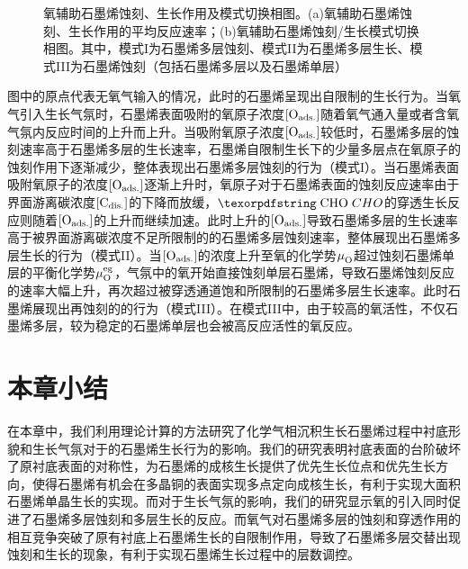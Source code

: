 \begin{figure}[htb]
    \caption{氧辅助石墨烯蚀刻、生长作用及模式切换相图。(a)氧辅助石墨烯蚀刻、生长作用的平均反应速率；(b)氧辅助石墨烯蚀刻/生长模式切换相图。其中，模式I为石墨烯多层蚀刻、模式II为石墨烯多层生长、模式III为石墨烯蚀刻（包括石墨烯多层以及石墨烯单层）}
    \label{fig:FLG_model}
\end{figure}

图中的原点代表无氧气输入的情况，此时的石墨烯呈现出自限制的生长行为。当氧气引入生长气氛时，石墨烯表面吸附的氧原子浓度$\rm{\left[O_{ads.}\right]} \it$随着氧气通入量或者含氧气氛内反应时间的上升而上升。当吸附氧原子浓度$\rm{\left[O_{ads.}\right]} \it$较低时，石墨烯多层的蚀刻速率高于石墨烯多层的生长速率，石墨烯自限制生长下的少量多层点在氧原子的蚀刻作用下逐渐减少，整体表现出石墨烯多层蚀刻的行为（模式I）。当石墨烯表面吸附氧原子的浓度$\rm{\left[O_{ads.}\right]} \it$逐渐上升时，氧原子对于石墨烯表面的蚀刻反应速率由于界面游离碳浓度$\rm{\left[C_{dis.}\right]} \it$的下降而放缓，$\cemb{CHO}$的穿透生长反应则随着$\rm{\left[O_{ads.}\right]} \it$的上升而继续加速。此时上升的$\rm{\left[O_{ads.}\right]} \it$导致石墨烯多层的生长速率高于被界面游离碳浓度不足所限制的的石墨烯多层蚀刻速率，整体展现出石墨烯多层生长的行为（模式II）。当$\rm{\left[O_{ads.}\right]} \it$的浓度上升至氧的化学势$\it \mu_{\rm O}^{\rm } \it$超过蚀刻石墨烯单层的平衡化学势$\it \mu_{\rm O}^{\rm eg} \it$，气氛中的氧开始直接蚀刻单层石墨烯，导致石墨烯蚀刻反应的速率大幅上升，再次超过被穿透通道饱和所限制的石墨烯多层生长速率。此时石墨烯展现出再蚀刻的的行为（模式III）。在模式III中，由于较高的氧活性，不仅石墨烯多层，较为稳定的石墨烯单层也会被高反应活性的氧反应。

\section{本章小结}
在本章中，我们利用理论计算的方法研究了化学气相沉积生长石墨烯过程中衬底形貌和生长气氛对于的石墨烯生长行为的影响。我们的研究表明衬底表面的台阶破坏了原衬底表面的对称性，为石墨烯的成核生长提供了优先生长位点和优先生长方向，使得石墨烯有机会在多晶铜的表面实现多点定向成核生长，有利于实现大面积石墨烯单晶生长的实现。而对于生长气氛的影响，我们的研究显示氧的引入同时促进了石墨烯多层蚀刻和多层生长的反应。而氧气对石墨烯多层的蚀刻和穿透作用的相互竞争突破了原有衬底上石墨烯生长的自限制作用，导致了石墨烯多层交替出现蚀刻和生长的现象，有利于实现石墨烯生长过程中的层数调控。
